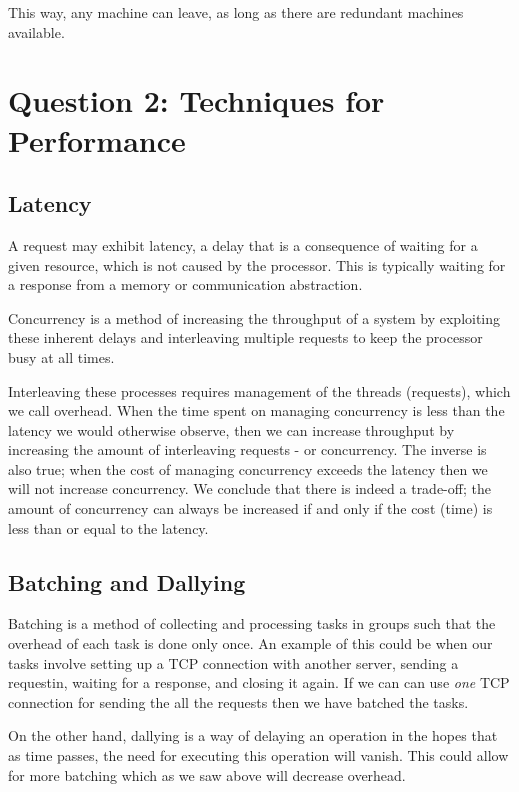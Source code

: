 \documentclass[11pt]{article}
\begin{document}
This way, any machine can leave, as long as there are redundant machines available.

\section*{Question 2: Techniques for Performance}

\subsection*{Latency}

A request may exhibit latency, a delay that is a consequence of waiting for
a given resource, which is not caused by the processor. This is typically
waiting for a response from a memory or communication abstraction.

Concurrency is a method of increasing the throughput of a system by exploiting
these inherent delays and interleaving multiple requests to keep the processor
busy at all times.

Interleaving these processes requires management of the threads (requests),
which we call overhead. When the time spent on managing concurrency is less
than the latency we would otherwise observe, then we can increase throughput
by increasing the amount of interleaving requests - or concurrency. The inverse
is also true; when the cost of managing concurrency exceeds the latency then
we will not increase concurrency. We conclude that there is indeed a trade-off;
the amount of concurrency can always be increased if and only if the cost (time)
is less than or equal to the latency.

\subsection*{Batching and Dallying}

Batching is a method of collecting and processing tasks in groups such that
the overhead of each task is done only once.
An example of this could be when our tasks involve setting up a TCP connection
with another server, sending a requestin, waiting for a response, and closing
it again. If we can can use \emph{one} TCP connection for sending the all the
requests then we have batched the tasks.

On the other hand, dallying is a way of delaying an operation in the hopes that
as time passes, the need for executing this operation will vanish. This
could allow for more batching which as we saw above will decrease overhead. 
\end{document}
